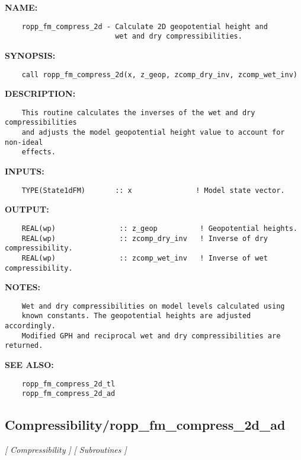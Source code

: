 \label{ch:robo18}
\label{ch:Compressibility_ropp_fm_compress_2d}
\textbf{NAME:}\hspace{0.08in}\begin{Verbatim}
    ropp_fm_compress_2d - Calculate 2D geopotential height and 
                          wet and dry compressibilities.
\end{Verbatim}
\textbf{SYNOPSIS:}\hspace{0.08in}\begin{Verbatim}
    call ropp_fm_compress_2d(x, z_geop, zcomp_dry_inv, zcomp_wet_inv)
\end{Verbatim}
\textbf{DESCRIPTION:}\hspace{0.08in}\begin{Verbatim}
    This routine calculates the inverses of the wet and dry compressibilities
    and adjusts the model geopotential height value to account for non-ideal
    effects.
\end{Verbatim}
\textbf{INPUTS:}\hspace{0.08in}\begin{Verbatim}
    TYPE(State1dFM)       :: x               ! Model state vector.
\end{Verbatim}
\textbf{OUTPUT:}\hspace{0.08in}\begin{Verbatim}
    REAL(wp)               :: z_geop          ! Geopotential heights.
    REAL(wp)               :: zcomp_dry_inv   ! Inverse of dry compressibility.
    REAL(wp)               :: zcomp_wet_inv   ! Inverse of wet compressibility.
\end{Verbatim}
\textbf{NOTES:}\hspace{0.08in}\begin{Verbatim}
    Wet and dry compressibilities on model levels calculated using 
    known constants. The geopotential heights are adjusted accordingly. 
    Modified GPH and reciprocal wet and dry compressibilities are returned. 
\end{Verbatim}
\textbf{SEE ALSO:}\hspace{0.08in}\begin{Verbatim}
    ropp_fm_compress_2d_tl
    ropp_fm_compress_2d_ad
\end{Verbatim}
\subsection{Compressibility/ropp\_fm\_compress\_2d\_ad}
\textsl{[ Compressibility ]}
\textsl{[ Subroutines ]}

